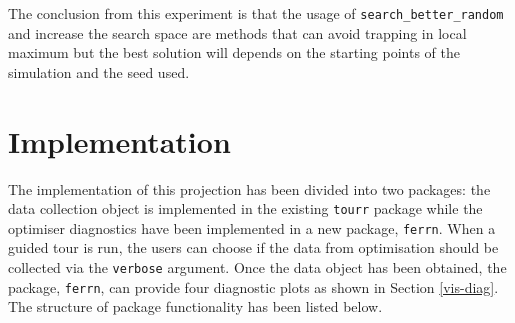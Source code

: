 \documentclass[12pt]{article}
\begin{document}
The conclusion from this experiment is that the usage of \texttt{search\_better\_random} and increase the search space are methods that can avoid trapping in local maximum but the best solution will depends on the starting points of the simulation and the seed used.

\hypertarget{implementation}{%
\section{Implementation}\label{implementation}}

The implementation of this projection has been divided into two packages: the data collection object is implemented in the existing \texttt{tourr} package while the optimiser diagnostics have been implemented in a new package, \texttt{ferrn}. When a guided tour is run, the users can choose if the data from optimisation should be collected via the \texttt{verbose} argument. Once the data object has been obtained, the package, \texttt{ferrn}, can provide four diagnostic plots as shown in Section \ref{vis-diag}. The structure of package functionality has been listed below.
\end{document}
